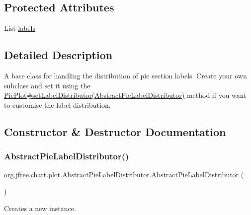 \subsection*{Protected Attributes}
\begin{DoxyCompactItemize}
\item 
List \mbox{\hyperlink{classorg_1_1jfree_1_1chart_1_1plot_1_1_abstract_pie_label_distributor_a8ba189619f28deb4e58ba191ea8bd61b}{labels}}
\end{DoxyCompactItemize}


\subsection{Detailed Description}
A base class for handling the distribution of pie section labels. Create your own subclass and set it using the \mbox{\hyperlink{classorg_1_1jfree_1_1chart_1_1plot_1_1_pie_plot_a8f4cdc293e6bfea16c6ac91daa60c22f}{Pie\+Plot\#set\+Label\+Distributor(\+Abstract\+Pie\+Label\+Distributor)}} method if you want to customise the label distribution. 

\subsection{Constructor \& Destructor Documentation}
\mbox{\label{classorg_1_1jfree_1_1chart_1_1plot_1_1_abstract_pie_label_distributor_afde6e18da10a61bc8d662f44aa43ad85}} 
\subsubsection{\texorpdfstring{Abstract\+Pie\+Label\+Distributor()}{AbstractPieLabelDistributor()}}
{\footnotesize\ttfamily org.\+jfree.\+chart.\+plot.\+Abstract\+Pie\+Label\+Distributor.\+Abstract\+Pie\+Label\+Distributor (\begin{DoxyParamCaption}{ }\end{DoxyParamCaption})}

Creates a new instance. 

